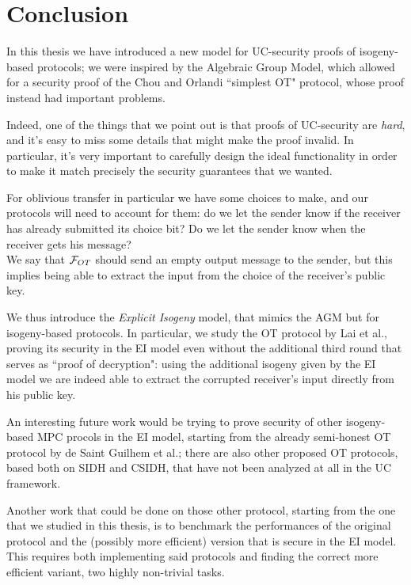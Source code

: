 \chapter*{Conclusion}

In this thesis we have introduced a new model for UC-security proofs of isogeny-based protocols; we were inspired by the Algebraic Group Model, which allowed for a security proof of the Chou and Orlandi ``simplest OT" protocol, whose proof instead had important problems.

Indeed, one of the things that we point out is that proofs of UC-security are \emph{hard}, and it's easy to miss some details that might make the proof invalid. In particular, it's very important to carefully design the ideal functionality in order to make it match precisely the security guarantees that we wanted.

For oblivious transfer in particular we have some choices to make, and our protocols will need to account for them: do we let the sender know if the receiver has already submitted its choice bit? Do we let the sender know when the receiver gets his message?\\
We say that $\mathcal{F}_{OT}$ should send an empty output message to the sender, but this implies being able to extract the input from the choice of the receiver's public key.

We thus introduce the \emph{Explicit Isogeny} model, that mimics the AGM but for isogeny-based protocols. In particular, we study the OT protocol by Lai et al., proving its security in the EI model even without the additional third round that serves as ``proof of decryption": using the additional isogeny given by the EI model we are indeed able to extract the corrupted receiver's input directly from his public key.

An interesting future work would be trying to prove security of other isogeny-based MPC procols in the EI model, starting from the already semi-honest OT protocol by de Saint Guilhem et al.; there are also other proposed OT protocols, based both on SIDH and CSIDH, that have not been analyzed at all in the UC framework.

Another work that could be done on those other protocol, starting from the one that we studied in this thesis, is to benchmark the performances of the original protocol and the (possibly more efficient) version that is secure in the EI model. This requires both implementing said protocols and finding the correct more efficient variant, two highly non-trivial tasks.

